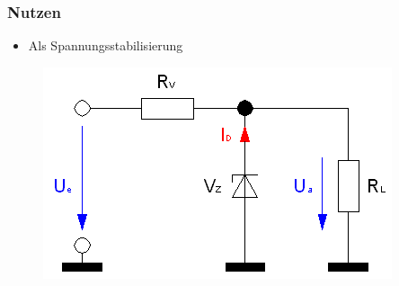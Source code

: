 \begin{frame}
    \frametitle{Nutzen}
      	\begin{itemize}
			\item Als Spannungsstabilisierung
    \end{itemize}    
    \begin{center}
	\begin{figure}
        \includegraphics[width=.8\textwidth,height=.6\textheight,keepaspectratio]{e12/Spannungsstabilisierung.png}
	\end{figure}
	\end{center}
\end{frame}

